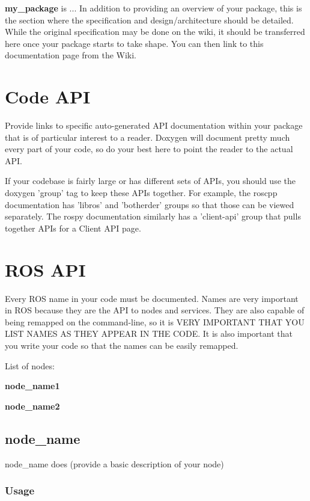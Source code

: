 

{\bfseries my\-\_\-package} is ... \-In addition to providing an overview of your package, this is the section where the specification and design/architecture should be detailed. \-While the original specification may be done on the wiki, it should be transferred here once your package starts to take shape. \-You can then link to this documentation page from the \-Wiki.\section{\-Code A\-P\-I}\label{index_codeapi}
\-Provide links to specific auto-\/generated \-A\-P\-I documentation within your package that is of particular interest to a reader. \-Doxygen will document pretty much every part of your code, so do your best here to point the reader to the actual \-A\-P\-I.

\-If your codebase is fairly large or has different sets of \-A\-P\-Is, you should use the doxygen 'group' tag to keep these \-A\-P\-Is together. \-For example, the roscpp documentation has 'libros' and 'botherder' groups so that those can be viewed separately. \-The rospy documentation similarly has a 'client-\/api' group that pulls together \-A\-P\-Is for a \-Client \-A\-P\-I page.\section{\-R\-O\-S A\-P\-I}\label{index_rosapi}
\-Every \-R\-O\-S name in your code must be documented. \-Names are very important in \-R\-O\-S because they are the \-A\-P\-I to nodes and services. \-They are also capable of being remapped on the command-\/line, so it is \-V\-E\-R\-Y \-I\-M\-P\-O\-R\-T\-A\-N\-T \-T\-H\-A\-T \-Y\-O\-U \-L\-I\-S\-T \-N\-A\-M\-E\-S \-A\-S \-T\-H\-E\-Y \-A\-P\-P\-E\-A\-R \-I\-N \-T\-H\-E \-C\-O\-D\-E. \-It is also important that you write your code so that the names can be easily remapped.

\-List of nodes\-:
\begin{DoxyItemize}
\item {\bfseries node\-\_\-name1} 
\item {\bfseries node\-\_\-name2} 
\end{DoxyItemize}



\subsection{node\-\_\-name}\label{index_node_name}
node\-\_\-name does (provide a basic description of your node)\subsubsection{\-Usage}\label{index_Usage}


